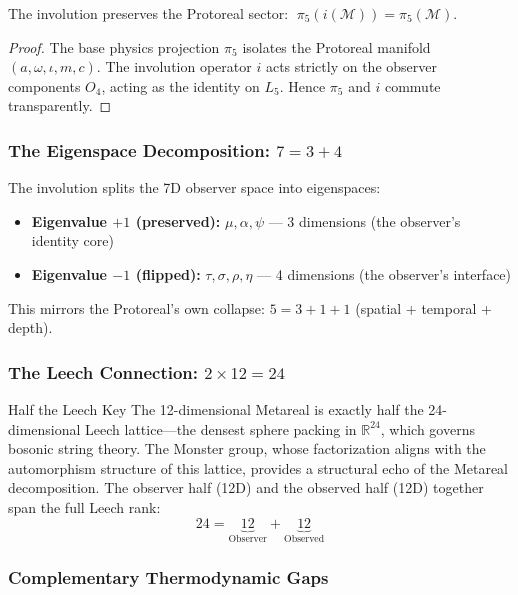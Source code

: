 \begin{theorem}
The involution preserves the Protoreal sector: $\;\pi_5(i(\mathcal{M})) = \pi_5(\mathcal{M})$.
\end{theorem}
\begin{proof}
The base physics projection $\pi_5$ isolates the Protoreal manifold $(a, \omega, \iota, m, c)$. The involution operator $i$ acts strictly on the observer components $O_4$, acting as the identity on $L_5$. Hence $\pi_5$ and $i$ commute transparently. \qedhere
\end{proof}

\subsubsection{The Eigenspace Decomposition: $7 = 3 + 4$}

The involution splits the 7D observer space into eigenspaces:
\begin{itemize}
    \item \textbf{Eigenvalue $+1$ (preserved):} $\mu, \alpha, \psi$ --- 3 dimensions (the observer's identity core)
    \item \textbf{Eigenvalue $-1$ (flipped):} $\tau, \sigma, \rho, \eta$ --- 4 dimensions (the observer's interface)
\end{itemize}

This mirrors the Protoreal's own collapse: $5 = 3 + 1 + 1$ (spatial + temporal + depth).

\subsubsection{The Leech Connection: $2 \times 12 = 24$}

\begin{metarealbox}{Half the Leech Key}
The 12-dimensional Metareal is exactly half the 24-dimensional Leech lattice---the densest sphere packing in $\mathbb{R}^{24}$, which governs bosonic string theory. The Monster group, whose factorization aligns with the automorphism structure of this lattice, provides a structural echo of the Metareal decomposition. The observer half (12D) and the observed half (12D) together span the full Leech rank:
\begin{equation}
    24 = \underbrace{12}_{\text{Observer}} + \underbrace{12}_{\text{Observed}}
\end{equation}
\end{metarealbox}

\subsubsection{Complementary Thermodynamic Gaps}

